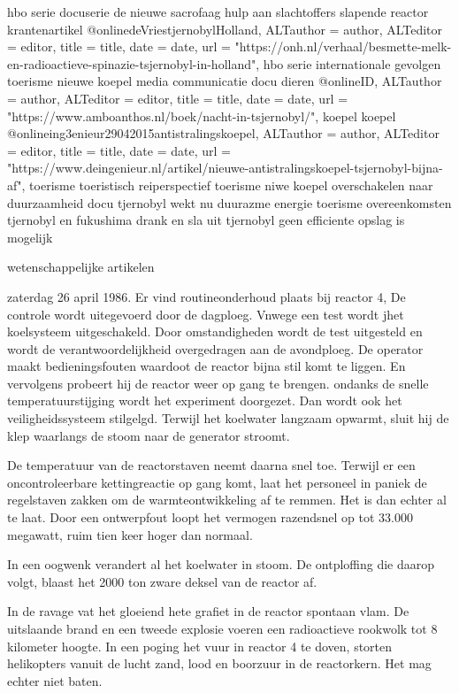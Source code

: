 {{hbo serie
docuserie
de  nieuwe sacrofaag
hulp aan slachtoffers
slapende reactor
krantenartikel
@online{deVriestjernobylHolland,	ALTauthor = {author},	ALTeditor = {editor},	title = {title},	date = {date},	url = {"https://onh.nl/verhaal/besmette-melk-en-radioactieve-spinazie-tsjernobyl-in-holland"},}
\cite{}
hbo serie
internationale gevolgen
toerisme
nieuwe koepel
media communicatie
docu
dieren
@online{ID,	ALTauthor = {author},	ALTeditor = {editor},	title = {title},	date = {date},	url = {"https://www.amboanthos.nl/boek/nacht-in-tsjernobyl/"},}
\cite{}
koepel
koepel
@online{ing3enieur29042015antistralingskoepel,	ALTauthor = {author},	ALTeditor = {editor},	title = {title},	date = {date},	url = {"https://www.deingenieur.nl/artikel/nieuwe-antistralingskoepel-tsjernobyl-bijna-af"},}
\cite{}
toerisme
toeristisch reiperspectief
toerisme
niwe koepel
overschakelen naar duurzaamheid
docu
tjernobyl wekt nu duurazme energie
toerisme
overeenkomsten tjernobyl en fukushima
drank en sla uit tjernobyl
geen efficiente opslag is mogelijk

wetenschappelijke artikelen

zaterdag 26 april 1986. Er vind routineonderhoud plaats bij reactor 4, De controle wordt uitegevoerd door de dagploeg. Vnwege een test wordt jhet koelsysteem uitgeschakeld. Door omstandigheden wordt de test uitgesteld en wordt de verantwoordelijkheid overgedragen aan de avondploeg.
De operator maakt bedieningsfouten waardoot de reactor bijna stil komt te liggen. En vervolgens probeert hij de reactor weer op gang te brengen. ondanks de snelle temperatuurstijging wordt het experiment doorgezet. Dan wordt ook het veiligheidssysteem stilgelgd. Terwijl het koelwater langzaam opwarmt, sluit hij de klep waarlangs de stoom naar de generator stroomt.

De temperatuur van de reactorstaven neemt daarna snel toe. Terwijl er een oncontroleerbare kettingreactie op gang komt, laat het personeel in paniek de regelstaven zakken om de warmteontwikkeling af te remmen. Het is dan echter al te laat. Door een ontwerpfout loopt het vermogen razendsnel op tot 33.000 megawatt, ruim tien keer hoger dan normaal.

In een oogwenk verandert al het koelwater in stoom. De ontploffing die daarop volgt, blaast het 2000 ton zware deksel van de reactor af.}

In de ravage vat het gloeiend hete grafiet in de reactor spontaan vlam. De uitslaande brand en een tweede explosie voeren een radioactieve rookwolk tot 8 kilometer hoogte. 
In een poging het vuur in reactor 4 te doven, storten helikopters vanuit de lucht zand, lood en boorzuur in de reactorkern. Het mag echter niet baten.

}
